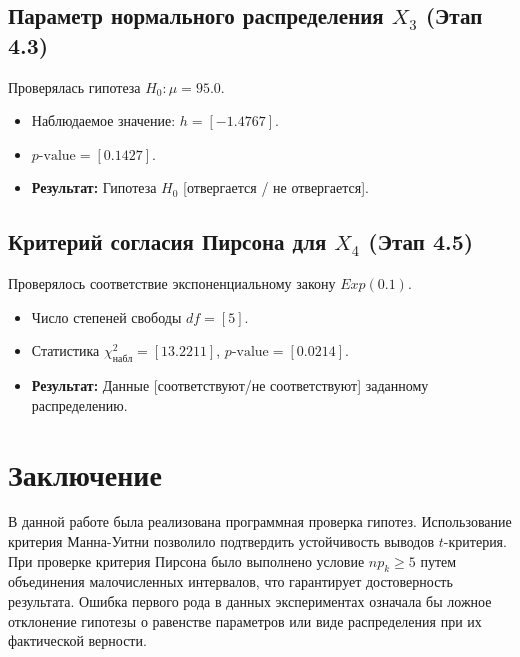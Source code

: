 \documentclass[a4paper,12pt]{article}
\begin{document}
\subsection{Параметр нормального распределения $X_3$ (Этап 4.3)}
Проверялась гипотеза $H_0: \mu = 95.0$.
\begin{itemize}
    \item Наблюдаемое значение: $h = [-1.4767]$.
    \item $p\text{-value} = [0.1427]$.
    \item \textbf{Результат:} Гипотеза $H_0$ [отвергается / не отвергается].
\end{itemize}

\subsection{Критерий согласия Пирсона для $X_4$ (Этап 4.5)}
Проверялось соответствие экспоненциальному закону $Exp(0.1)$.
\begin{itemize}
    \item Число степеней свободы $df = [5]$.
    \item Статистика $\chi^2_{набл} = [13.2211]$, $p\text{-value} = [0.0214]$.
    \item \textbf{Результат:} Данные [соответствуют/не соответствуют] заданному распределению.
\end{itemize}

\section{Заключение}
В данной работе была реализована программная проверка гипотез. Использование критерия Манна-Уитни позволило подтвердить устойчивость выводов $t$-критерия. При проверке критерия Пирсона было выполнено условие $np_k \ge 5$ путем объединения малочисленных интервалов, что гарантирует достоверность результата. Ошибка первого рода в данных экспериментах означала бы ложное отклонение гипотезы о равенстве параметров или виде распределения при их фактической верности.
\end{document}
